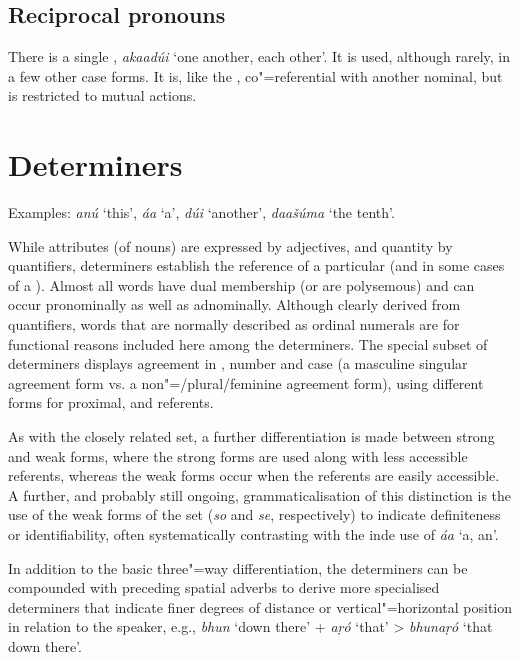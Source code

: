 \subsection{Reciprocal pronouns}
\label{subsec:3b-6-5}
There is a single , \textit{akaadúi} `one another, each other'. It is used, although rarely, in a few other case forms. It is, like the , co"=referential with another nominal, but is restricted to mutual actions.


\section{Determiners}
\label{sec:3b-7}
Examples: \textit{anú} `this', \textit{áa} `a', \textit{dúi} `another', \textit{daašúma} `the tenth'.


While attributes (of nouns) are expressed by adjectives, and quantity by quantifiers, determiners establish the reference of a particular  (and in some cases of a ). Almost all  words have dual membership (or are polysemous) and can occur pronominally as well as adnominally. Although clearly derived from quantifiers, words that are normally described as ordinal numerals are for functional reasons included here among the determiners. The special subset of  determiners displays agreement in , number and case (a  masculine singular agreement form vs. a non"=/plural/feminine agreement form), using different forms for proximal,  and  referents.


As with the closely related   set, a further differentiation is made between strong and weak forms, where the strong forms are used along with less accessible  referents, whereas the weak forms occur when the referents are easily accessible. A further, and probably still ongoing, grammaticalisation of this distinction is the use of the weak forms of the  set (\textit{so} and \textit{se}, respectively) to indicate definiteness or identifiability, often systematically contrasting with the inde use of \textit{áa} `a, an'.


In addition to the basic three"=way differentiation, the  determiners can be compounded with preceding spatial adverbs to derive more specialised determiners that  indicate finer degrees of distance or vertical"=horizontal position in relation to the speaker, e.g., \textit{bhun} `down there' + \textit{aṛó} `that' > \textit{bhunaṛó} `that down there'.


